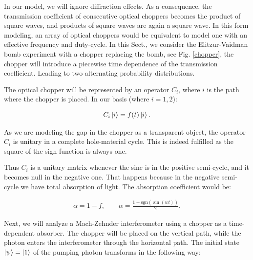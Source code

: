 \documentclass[12pt]{book}
\begin{document}
In our model, we will ignore diffraction effects. As a consequence, the transmission coefficient of consecutive optical choppers becomes the product of square waves, and products of square waves are again a square wave. In this form modeling, an array of optical choppers would be equivalent to model one with an effective frequency and duty-cycle. In this Sect., we consider the Elitzur-Vaidman bomb experiment with a chopper replacing the bomb, see Fig. \ref{chopper}, the chopper will introduce a piecewise time dependence of the transmission coefficient. Leading to two alternating probability distributions.


The optical chopper will be represented by an operator $C_{i}$, where $i$ is the path where the chopper is placed. In our basis (where $i=1,2$):

\begin{equation}
C_{i}\ket{i}=f(t)\ket{i}.
\end{equation}

As we are modeling the gap in the chopper as a transparent object, the operator $C_i$ is unitary in a complete hole-material cycle.  This is indeed fulfilled as the square of the sign function is always one.


Thus $C_{i}$ is a unitary matrix whenever the sine is in the positive semi-cycle, and it becomes null in the negative one. That happens because in the negative semi-cycle we have total absorption of light. The absorption coefficient would  be:  

\begin{align}
 \alpha=1-f,\qquad \alpha=\frac{1-\mathrm{sgn}(\sin(wt))}{2}.
\end{align}

Next, we will analyze a Mach-Zehnder interferometer using a chopper as a time-dependent absorber. The chopper will be placed on the vertical path, while the photon enters the interferometer through the horizontal path. The initial state $\ket{\psi}=\ket{1}$ of the pumping photon transforms in the following way:
\end{document}
